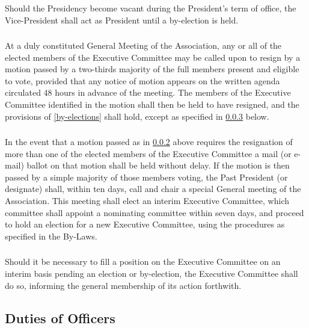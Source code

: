 \documentclass[12pt]{article}
\begin{document}
\subsubsection{}
Should the Presidency become vacant during the President's term of office, the Vice-President shall act as President until a by-election is held.

\subsubsection{}
\label{remove-one}
At a duly constituted General Meeting of the Association, any or all of the elected members of the Executive Committee may be called upon to resign by a motion passed by a two-thirds majority of the full members present and eligible to vote, provided that any notice of motion appears on the written agenda circulated 48 hours in advance of the meeting. The members of the Executive Committee identified in the motion shall then be held to have resigned, and the provisions of \ref{by-elections} shall hold, except as specified in \ref{remove-more} below.

\subsubsection{}
\label{remove-more}

In the event that a motion passed as in \ref{remove-one} above requires the resignation of more than one of the elected members of the Executive Committee a mail (or e-mail) ballot on that motion shall be held without delay. If the motion is then passed by a simple majority of those members voting, the Past President (or designate) shall, within ten days, call and chair a special General meeting of the Association. This meeting shall elect an interim Executive Committee, which committee shall appoint a nominating committee within seven days, and proceed to hold an election for a new Executive Committee, using the procedures as specified in the By-Laws.

\subsubsection{}
Should it be necessary to fill a position on the Executive Committee on an interim basis pending an election or by-election, the Executive Committee shall do so, informing the general membership of its action forthwith.

\subsection{Duties of Officers}
\end{document}
